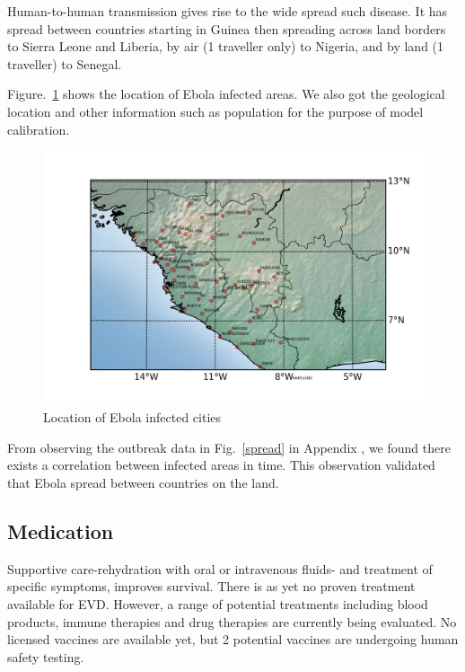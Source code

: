 \documentclass[11pt]{article}
\begin{document}
Human-to-human transmission gives rise to the wide spread such disease. It has spread between countries starting in Guinea then spreading across land borders to Sierra Leone and Liberia, by air (1 traveller only) to Nigeria, and by land (1 traveller) to Senegal.\cite{ebolanew}

Figure.~\ref{cities} shows the location of Ebola infected areas. We also got the geological location and other information such as population for the purpose of model calibration.

\begin{figure}[hbt]
\begin{center}
  \includegraphics[width=6in]{graph/map3.png}
  \caption{Location of Ebola infected cities}
  \label{cities}
\end{center}  
\end{figure}

From observing the outbreak data in Fig.~\ref{spread} in Appendix , we found there exists a correlation  between infected areas in time. This observation validated that Ebola spread between countries on the land.



\subsection{Medication}

Supportive care-rehydration with oral or intravenous fluids- and treatment of specific symptoms, improves survival. There is as yet no proven treatment available for EVD. However, a range of potential treatments including blood products, immune therapies and drug therapies are currently being evaluated. No licensed vaccines are available yet, but 2 potential vaccines are undergoing human safety testing.
\end{document}
